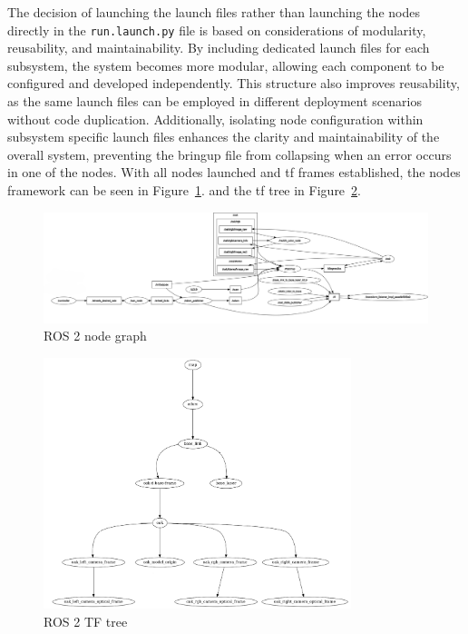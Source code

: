 The decision of launching the launch files rather than launching the nodes directly in the \texttt{run.launch.py} file is based on considerations of modularity, reusability, and maintainability. By including dedicated launch files for each subsystem, the system becomes more modular, allowing each component to be configured and developed independently. This structure also improves reusability, as the same launch files can be employed in different deployment scenarios without code duplication. Additionally, isolating node configuration within subsystem specific launch files enhances the clarity and maintainability of the overall system, preventing the bringup file from collapsing when an error occurs in one of the nodes.
With all nodes launched and \gls{tf} frames established, the nodes framework can be seen in Figure~\ref{fig:ros2_node_graph}. and the \gls{tf} tree in Figure~\ref{fig:ros2_tf_tree}.
\begin{figure}[H]
  \centering
  \includegraphics[width=1\textwidth]{imgs/rosgraph.png}
  \caption{ROS 2 node graph}
  \label{fig:ros2_node_graph}
\end{figure}

\begin{figure}[H]
  \centering
  \includegraphics[width=0.8\textwidth]{imgs/frames_2025-05-30_13.29.21-1.png}
  \caption{ROS 2 TF tree}
  \label{fig:ros2_tf_tree}
\end{figure}

